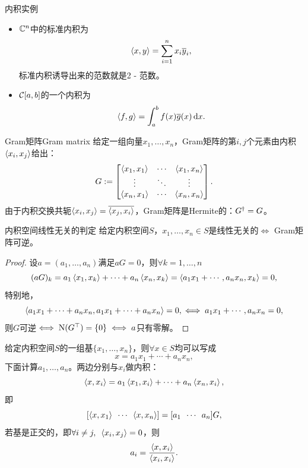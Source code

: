 \begin{example}
    {内积实例}{}
    \begin{itemize}
        \item $\mathbb C^n$中的标准内积为
        \[
            \left\langle x,y\right\rangle=\sum_{i=1}^nx_i\overline y_i,
        \]
        标准内积诱导出来的范数就是2 - 范数。
        \item $\mathcal C[a,b]$的一个内积为 
        \[
            \left\langle f,g\right\rangle=\int_a^bf(x)\overline g(x)\mathop{}\!\mathrm{d} x.
        \]
    \end{itemize}
\end{example}

\begin{definition}
    {Gram矩阵}{Gram matrix}
    给定一组向量$x_1,\ldots,x_n$，Gram矩阵的第$i,j$个元素由内积$\left\langle x_i,x_j\right\rangle$给出：
    \begin{equation}
        G:=\begin{bmatrix}
            \left\langle x_1,x_1\right\rangle&\cdots&\left\langle x_1,x_n\right\rangle\\
            \vdots&\ddots&\vdots\\
            \left\langle x_n,x_1\right\rangle&\cdots&\left\langle x_n,x_n\right\rangle
        \end{bmatrix}.
    \end{equation}
    由于内积交换共轭$\left\langle x_i,x_j\right\rangle=\overline{\left\langle x_j,x_i\right\rangle}$，Gram矩阵是Hermite的：$G^\dagger=G$。
\end{definition}

\begin{theorem}
    {内积空间线性无关的判定}{}
    给定内积空间$S$，$x_1,\ldots,x_n\in S$是线性无关的$\iff$ Gram矩阵可逆。
\end{theorem}

\begin{proof}
    设$a=(a_1,\ldots,a_n)$满足$aG=0$，则$\forall k=1,\ldots,n$
    \[
        (aG)_k=a_1\left\langle x_1,x_k\right\rangle+\cdots+a_n\left\langle x_n,x_k\right\rangle=\left\langle a_1x_1+\cdots,a_nx_n,x_k\right\rangle=0,
    \]
    特别地，
    \[
        \left\langle a_1x_1+\cdots+a_nx_n,a_1x_1+\cdots+a_nx_n\right\rangle=0,\iff a_1x_1+\cdots,a_nx_n=0,
    \]
    则$G$可逆$\iff \mathrm N(G^\top)=\{0\}\iff a$只有零解。
\end{proof}

\begin{example}
    {}{}
    给定内积空间$S$的一组基$\{x_1,\ldots,x_n\}$，则$\forall x\in S$均可以写成
    \[
        x=a_1x_1+\cdots+a_nx_n,
    \]
    下面计算$a_1,\ldots,a_n$。两边分别与$x_i$做内积：
    \[
        \left\langle x,x_i\right\rangle=a_1\left\langle x_1,x_i\right\rangle+\cdots+a_n\left\langle x_n,x_i\right\rangle,
    \]
    即
    \[
        [\left\langle x,x_1\right\rangle\enspace\cdots\enspace\left\langle x,x_n\right\rangle]=[a_1\enspace\cdots\enspace a_n]G,
    \]
    若基是正交的，即$\forall i\neq j,\enspace\left\langle x_i,x_j\right\rangle=0$，则 
    \[
        a_i=\frac{\left\langle x,x_i\right\rangle}{\left\langle x_i,x_i\right\rangle}.
    \]
\end{example}

